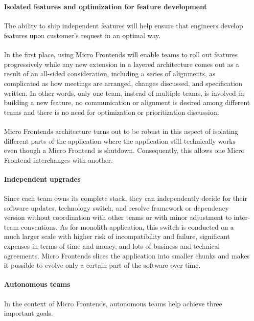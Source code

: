 \documentclass[a4paper]{book}
\begin{document}
\\ \\
\textbf{Isolated features and optimization for feature development}
\\ \\
The ability to ship independent features will help ensure that engineers develop features upon customer’s request in an optimal way. 
\\ \\
In the first place, using Micro Frontends will enable teams to roll out features progressively while any new extension in a layered architecture comes out as a result of an all-sided consideration, including a series of alignments, as complicated as how meetings are arranged, changes discussed, and specification written. In other words, only one team, instead of multiple teams, is involved in building a new feature, no communication or alignment is desired among different teams and there is no need for optimization or prioritization discussion.
\\ \\
Micro Frontends architecture turns out to be robust in this aspect of isolating different parts of the application where the application still technically works even though a Micro Frontend is shutdown. Consequently, this allows one Micro Frontend interchanges with another.
\\ \\
\textbf{Independent upgrades}
\\ \\
Since each team owns its complete stack, they can independently decide for their software updates, technology switch, and resolve framework or dependency version without coordination with other teams or with minor adjustment to inter-team conventions. As for monolith application, this switch is conducted on a much larger scale with higher risk of incompatibility and failure, significant expenses in terms of time and money, and lots of business and technical agreements. Micro Frontends slices the application into smaller chunks and makes it possible to evolve only a certain part of the software over time.
\\ \\
\textbf{Autonomous teams}
\\ \\
In the context of Micro Frontends, autonomous teams help achieve three important goals.
\\ \\
\end{document}
